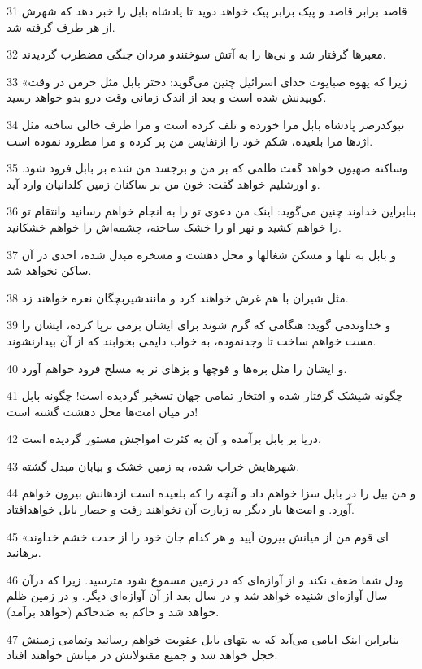 \par 31 قاصد برابر قاصد و پیک برابر پیک خواهد دوید تا پادشاه بابل را خبر دهد که شهرش از هر طرف گرفته شد.
\par 32 معبرها گرفتار شد و نی‌ها را به آتش سوختندو مردان جنگی مضطرب گردیدند.
\par 33 «زیرا که یهوه صبایوت خدای اسرائیل چنین می‌گوید: دختر بابل مثل خرمن در وقت کوبیدنش شده است و بعد از اندک زمانی وقت درو بدو خواهد رسید.
\par 34 نبوکدرصر پادشاه بابل مرا خورده و تلف کرده است و مرا ظرف خالی ساخته مثل اژدها مرا بلعیده، شکم خود را ازنفایس من پر کرده و مرا مطرود نموده است.
\par 35 وساکنه صهیون خواهد گفت ظلمی که بر من و برجسد من شده بر بابل فرود شود. و اورشلیم خواهد گفت: خون من بر ساکنان زمین کلدانیان وارد آید.
\par 36 بنابراین خداوند چنین می‌گوید: اینک من دعوی تو را به انجام خواهم رسانید وانتقام تو را خواهم کشید و نهر او را خشک ساخته، چشمه‌اش را خواهم خشکانید.
\par 37 و بابل به تلها و مسکن شغالها و محل دهشت و مسخره مبدل شده، احدی در آن ساکن نخواهد شد.
\par 38 مثل شیران با هم غرش خواهند کرد و مانندشیربچگان نعره خواهند زد.
\par 39 و خداوندمی گوید: هنگامی که گرم شوند برای ایشان بزمی برپا کرده، ایشان را مست خواهم ساخت تا وجدنموده، به خواب دایمی بخوابند که از آن بیدارنشوند.
\par 40 و ایشان را مثل بره‌ها و قوچها و بزهای نر به مسلخ فرود خواهم آورد.
\par 41 چگونه شیشک گرفتار شده و افتخار تمامی جهان تسخیر گردیده است! چگونه بابل در میان امت‌ها محل دهشت گشته است!
\par 42 دریا بر بابل برآمده و آن به کثرت امواجش مستور گردیده است.
\par 43 شهرهایش خراب شده، به زمین خشک و بیابان مبدل گشته.
\par 44 و من بیل را در بابل سزا خواهم داد و آنچه را که بلعیده است ازدهانش بیرون خواهم آورد. و امت‌ها بار دیگر به زیارت آن نخواهند رفت و حصار بابل خواهدافتاد.
\par 45 «ای قوم من از میانش بیرون آیید و هر کدام جان خود را از حدت خشم خداوند برهانید.
\par 46 ودل شما ضعف نکند و از آوازه‌ای که در زمین مسموع شود مترسید. زیرا که درآن سال آوازه‌ای شنیده خواهد شد و در سال بعد از آن آوازه‌ای دیگر. و در زمین ظلم خواهد شد و حاکم به ضدحاکم (خواهد برآمد).
\par 47 بنابراین اینک ایامی می‌آید که به بتهای بابل عقوبت خواهم رسانید وتمامی زمینش خجل خواهد شد و جمیع مقتولانش در میانش خواهند افتاد.
